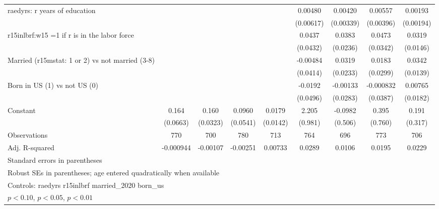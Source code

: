 \begin{table}[htbp]
\begin{tabular}{l*{8}{c}}
\addlinespace
raedyrs: r years of education&                  &                  &                  &                  &  0.00480         &  0.00420         &  0.00557         &  0.00193         \\
                &                  &                  &                  &                  &(0.00617)         &(0.00339)         &(0.00396)         &(0.00194)         \\
\addlinespace
r15inlbrf:w15 =1 if r is in the labor force&                  &                  &                  &                  &   0.0437         &   0.0383         &   0.0473         &   0.0319\sym{**} \\
                &                  &                  &                  &                  & (0.0432)         & (0.0236)         & (0.0342)         & (0.0146)         \\
\addlinespace
Married (r15mstat: 1 or 2) vs not married (3-8)&                  &                  &                  &                  & -0.00484         &   0.0319         &   0.0183         &   0.0342\sym{**} \\
                &                  &                  &                  &                  & (0.0414)         & (0.0233)         & (0.0299)         & (0.0139)         \\
\addlinespace
Born in US (1) vs not US (0)&                  &                  &                  &                  &  -0.0192         & -0.00133         &-0.000832         &  0.00765         \\
                &                  &                  &                  &                  & (0.0496)         & (0.0283)         & (0.0387)         & (0.0182)         \\
\addlinespace
Constant        &    0.164\sym{**} &    0.160\sym{***}&   0.0960\sym{*}  &   0.0179         &    2.205\sym{**} &  -0.0982         &    0.395         &    0.191         \\
                & (0.0663)         & (0.0323)         & (0.0541)         & (0.0142)         &  (0.981)         &  (0.506)         &  (0.760)         &  (0.317)         \\
\midrule
Observations    &      770         &      700         &      780         &      713         &      764         &      696         &      773         &      706         \\
Adj. R-squared  &-0.000944         & -0.00107         & -0.00251         &  0.00733         &   0.0289         &   0.0106         &   0.0195         &   0.0229         \\
\bottomrule
\multicolumn{9}{l}{\footnotesize Standard errors in parentheses}\\
\multicolumn{9}{l}{\footnotesize Robust SEs in parentheses; age entered quadratically when available}\\
\multicolumn{9}{l}{\footnotesize Controls:  raedyrs r15inlbrf married\_2020 born\_us}\\
\multicolumn{9}{l}{\footnotesize \sym{*} \(p<0.10\), \sym{**} \(p<0.05\), \sym{***} \(p<0.01\)}\\
\end{tabular}
\end{table}
